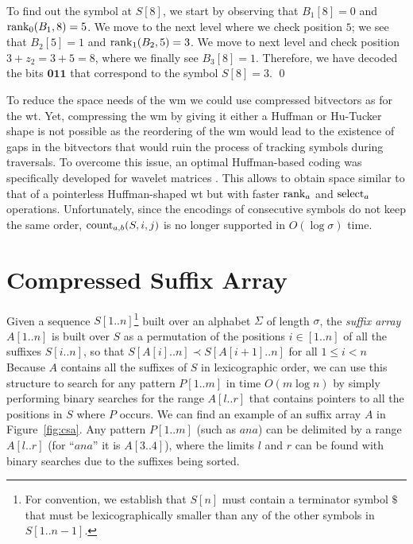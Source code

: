 \documentclass[a4paper,10pt,twoside]{book}
\begin{document}
    \medskip
    \begin{example}
    To find out the symbol at $S[8]$, we start by observing that $B_1[8]=0$ and $\operatorname{rank}_0(B_1,8)=5$. We move to the next level where we check position $5$; we see that $B_2[5]=1$ and $\operatorname{rank}_1(B_2,5)=3$. We move to next level and check position $3+z_2 = 3+5 = 8$,
    where we finally see $B_3[8]=1$. Therefore, we have decoded the bits $\mathbf{011}$ that correspond to the symbol $S[8] = 3$.
    \qed
    \end{example}
    
    To reduce the space needs of the \gls{wm} we could use compressed bitvectors as for the \gls{wt}. Yet, 
    compressing the \gls{wm} by giving it either a Huffman or Hu-Tucker shape is not possible as the reordering of the \gls{wm} would lead to the existence of %
    gaps in the bitvectors 
    that would ruin the process of 
    tracking symbols during traversals. To overcome this issue, an optimal Huffman-based coding was 
    specifically developed for wavelet matrices \cite{CNO15, Farina2016}. This allows to obtain space
    similar to that of a pointerless Huffman-shaped \gls{wt} but with faster $\operatorname{rank}_a$ and $\operatorname{select}_a$ operations.
    Unfortunately, since the encodings of consecutive symbols do not keep the same order, $\operatorname{count}_{a,b}(S,i,j)$ is no longer supported in $O(\log\sigma)$ time.
	
	\section{Compressed Suffix Array}
	\label{sec:csa}
	Given a sequence $S[1..n]$\footnote{For convention, we establish that $S[n]$ must contain a terminator symbol $\$$ that must be lexicographically smaller than any of the other symbols in $S[1..n-1]$.} built over an alphabet $\Sigma$ of length
    $\sigma$, the {\em suffix array} $A[1..n]$ is built over $S$ \cite{MM93}
    as a permutation of the positions $i \in [1..n]$ of all the suffixes $S[i..n]$, so that
    $S[A[i]..n] \prec S[A[i+1]..n]$ for all $1 \le i < n$
    Because $A$ contains all the suffixes of $S$ in lexicographic order,
    we can use this structure to search for any pattern $P[1..m]$ in time
    $O(m \log n)$ by simply performing binary searches for the range $A[l..r]$ that
    contains pointers to all the positions in $S$ where $P$ occurs.
    We can find an example of an suffix array $A$ in Figure~\ref{fig:csa}. Any pattern $P[1..m]$ (such as $ana$) can be delimited by a range $A[l..r]$ (for ``$ana$'' it is $A[3..4]$), where the limits $l$ and $r$ can be found with binary searches due to the suffixes being sorted.
    
\end{document}

